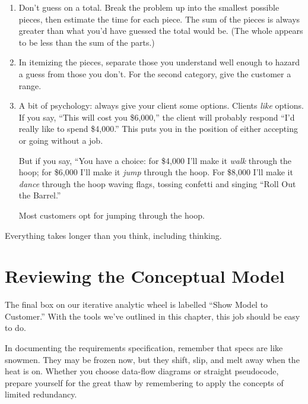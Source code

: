 \begin{enumerate}

\item Don't guess on a total. Break the problem up into the smallest
possible pieces, then estimate the time for each piece. The sum of the
pieces is always greater than what you'd have guessed the total would
be. (The whole appears to be less than the sum of the parts.)

\item In itemizing the pieces, separate those you understand well
enough to hazard a guess from those you don't. For the second
category, give the customer a range.

\item A bit of psychology: always give your client some options.
Clients \emph{like} options. If you say, ``This will cost you \$6,000,''
the client will probably respond ``I'd really like to spend \$4,000.''
This puts you in the position of either accepting or going without a job.

But if you say, ``You have a choice: for \$4,000 I'll make it
\emph{walk} through the hoop; for \$6,000 I'll make it \emph{jump}
through the hoop. For \$8,000 I'll make it \emph{dance} through the
hoop waving flags, tossing confetti and singing ``Roll Out the Barrel.''

Most customers opt for jumping through the hoop.
\end{enumerate}

\begin{tip}
Everything takes longer than you think, including thinking.
\end{tip}

\section{Reviewing the Conceptual Model}

The final box on our iterative analytic wheel is labelled ``Show Model
to Customer.'' With the tools we've outlined in this chapter, this job
should be easy to do.

In documenting the requirements specification, remember that specs are
like snowmen. They may be frozen now, but they shift, slip, and melt
away when the heat is on. Whether you choose data-flow diagrams or
straight \Forth{} pseudocode, prepare yourself for the great thaw by
remembering to apply the concepts of limited redundancy.

